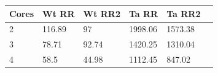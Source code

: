 \begin{center}
    \begin{tabular}{ | l | l | l | l | l | p{5cm} |}
    \hline
    Cores & Wt RR & Wt RR2 & Ta RR & Ta RR2 \\ \hline
    2 & 116.89 & 97 & 1998.06 & 1573.38 \\ \hline
    3 & 78.71 & 92.74 & 1420.25 & 1310.04 \\ \hline
    4 & 58.5 & 44.98 & 1112.45 & 847.02 \\
	\hline
    \end{tabular}
\end{center}


